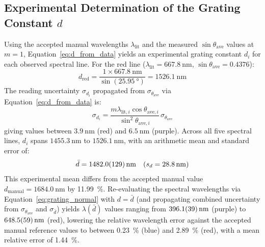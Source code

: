 \documentclass[journal]{IEEEtran}
\begin{document}
\subsection{Experimental Determination of the Grating Constant \texorpdfstring{$d$}{d}}
Using the accepted manual wavelengths $\lambda_{\text{lit}}$ and the measured $\sin\theta_{\text{ave}}$ values at $m = 1$, Equation~\eqref{eq:d_from_data} yields an experimental grating constant $d_i$ for each observed spectral line. For the red line ($\lambda_{\text{lit}} = \SI{667.8}{\nano\meter}$, $\sin\theta_{\text{ave}} = 0.4376$):
\begin{equation}
    d_{\text{red}} = \frac{1 \times \SI{667.8}{\nano\meter}}{\sin(\SI{25.95}{\degree})} = \SI{1526.1}{\nano\meter}
    \label{eq:example_d_calc}
\end{equation}
The reading uncertainty $\sigma_{d_i}$ propagated from $\sigma_{\theta_{\text{ave}}}$ via Equation~\eqref{eq:d_from_data} is:
\begin{equation}
    \sigma_{d_i} = \frac{m \lambda_{\text{lit},i} \cos\theta_{\text{ave},i}}{\sin^2\theta_{\text{ave},i}}\,\sigma_{\theta_{\text{ave}}}
    \label{eq:sigma_d_calc}
\end{equation}
giving values between $\SI{3.9}{\nano\meter}$ (red) and $\SI{6.5}{\nano\meter}$ (purple). Across all five spectral lines, $d_i$ spans $\SI{1455.3}{\nano\meter}$ to $\SI{1526.1}{\nano\meter}$, with an arithmetic mean and standard error of:
\begin{equation}
    \bar{d} = \SI{1482.0 \pm 12.9}{\nano\meter} \quad (s_d = \SI{28.8}{\nano\meter})
    \label{eq:d_bar}
\end{equation}
This experimental mean differs from the accepted manual value $d_{\text{manual}} = \SI{1684.0}{\nano\meter}$ by \SI{11.99}{\percent}. Re-evaluating the spectral wavelengths via Equation~\eqref{eq:grating_normal} with $d = \bar{d}$ (and propagating combined uncertainty from $\sigma_{\theta_{\text{ave}}}$ and $\sigma_{\bar{d}}$) yields $\lambda(\bar{d})$ values ranging from $\SI{396.1 \pm 3.9}{\nano\meter}$ (purple) to $\SI{648.5 \pm 5.9}{\nano\meter}$ (red), lowering the relative wavelength error against the accepted manual reference values to between \SI{0.23}{\percent} (blue) and \SI{2.89}{\percent} (red), with a mean relative error of \SI{1.44}{\percent}.
\end{document}

